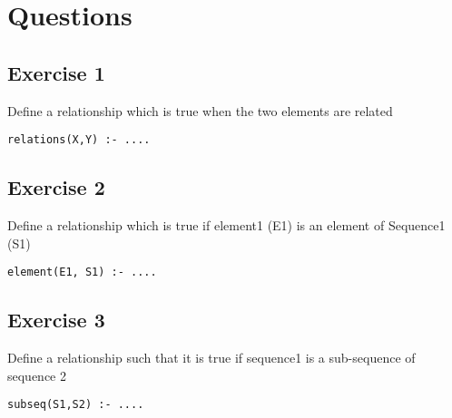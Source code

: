 \documentclass{article}
\begin{document}
\section{Questions}

\subsection{Exercise 1}

Define a relationship which is true when the two elements are related
\begin{verbatim}
relations(X,Y) :- ....
\end{verbatim}

\subsection{Exercise 2}

Define a relationship which is true if element1 (E1) is an element of Sequence1
(S1)
\begin{verbatim}
element(E1, S1) :- ....
\end{verbatim}

\subsection{Exercise 3}

Define a relationship such that it is true if sequence1 is a sub-sequence of
sequence 2
\begin{verbatim}
subseq(S1,S2) :- ....
\end{verbatim}
\end{document}
